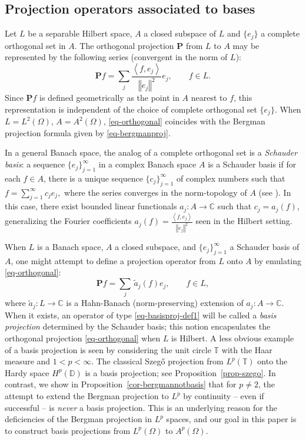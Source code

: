 \documentclass[letterpaper,11pt,reqno]{amsart}
\theoremstyle{plain}
\theoremstyle{definition}
\theoremstyle{remark}
\theoremstyle{remark}
\numberwithin{equation}{section}
\newcommand{\norm}[1]{\left\Vert#1\right\Vert}
\newcommand{\wt}{\widetilde}
\newcommand{\ipr}[1]{\left\langle #1 \right\rangle}
\newcommand{\cx}{{\mathbb C}}
\newcommand{\C}{{\mathbb C}}
\newcommand{\D}{{\mathbb D}}
\newcommand{\T}{{\mathbb T}}
\begin{document}
\subsection{Projection operators associated to bases}\label{sec-intro-projop} 
Let $L$ be a separable Hilbert space, $A$ a closed subspace of $L$ and $\{e_j\}$ a complete orthogonal set in $A$.
The orthogonal projection $\bm{P}$ from $L$ to $A$ may be represented by the following series (convergent in the norm of $L$):
\begin{equation}\label{eq-orthogonal}
\bm{P}f = \sum_j \frac{\ipr{f,e_j} }{\norm{ e_j}^2}e_j, \qquad f\in L.
\end{equation}
Since $\bm{P}f$ is defined geometrically as the point in $A$ nearest to $f$, this representation is independent of the choice of complete orthogonal set $\{e_j\}$.
When $L=L^2(\Omega),\, A=A^2(\Omega)$, \eqref{eq-orthogonal} coincides with the Bergman projection formula given by \eqref{eq-bergmanproj}.

In a general Banach space, the analog of a complete orthogonal set is a \emph{Schauder basis}:
a sequence $\{e_j\}_{j=1}^\infty$ in a complex Banach space $A$ is a Schauder basis if for each $f \in A$, there is a unique sequence $\{c_j\}_{j=1}^\infty$ of complex numbers such that $f = \sum_{j=1}^\infty c_je_j,$ where the series converges in the norm-topology of $A$ (see \cite{lt}). 
In this case, there exist bounded linear functionals $a_j:A\to \cx$ such that $c_j=a_j(f)$, generalizing the Fourier coefficients $a_j(f)=\frac{\ipr{f,e_j}}{\norm{e_j}^2}$ seen in the Hilbert setting.  

When $L$ is a Banach space, $A$ a closed subspace, and $\{e_j\}_{j=1}^\infty$ a Schauder basis of $A$, one might attempt to define a projection operator from $L$ onto $A$ by emulating \eqref{eq-orthogonal}:
\begin{equation}\label{eq-basisproj-def1} 
\bm{P}f = \sum_j \,\wt{a}_j(f) e_j, \qquad f\in L,
\end{equation}
where $\wt{a}_j:L\to \cx$ is a Hahn-Banach (norm-preserving) extension of $a_j:A \to \C$.
When it exists, an operator of type \eqref{eq-basisproj-def1} will be called a \emph{basis projection} determined by the Schauder basis; this notion encapsulates the orthogonal projection \eqref{eq-orthogonal} when $L$ is Hilbert. 
A less obvious example of a basis projection is seen by considering the unit circle $\T$ with the Haar measure and $1<p<\infty$. 
The classical Szeg\H{o} projection from $L^p(\T)$ onto the Hardy space $H^p(\D)$ is a basis projection; see Proposition~\ref{prop-szego}.
In contrast, we show in Proposition~\ref{cor-bergmannotbasis} that for $p \neq 2$, the attempt to extend the Bergman projection to $L^p$ by continuity -- even if successful -- is \emph{never} a basis projection. 
This is an underlying reason for the deficiencies of the Bergman projection in $L^p$ spaces, and our goal in this paper is to construct basis projections from $L^p(\Omega)$ to $A^p(\Omega)$. 
\end{document}
